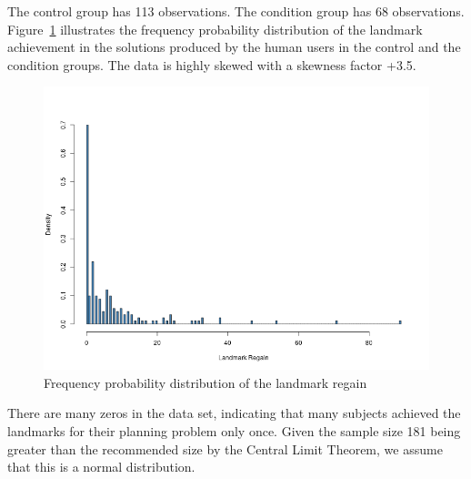 The control group has 113 observations.
The condition group has 68 observations.
Figure~\ref{fig:histreg} illustrates the frequency probability distribution of the landmark achievement in the solutions produced by the human users in the control and the condition groups. 
The data is highly skewed with a skewness factor +3.5.
\begin{figure}[tpb]
  \centering
\includegraphics[width=0.7\columnwidth]{img/histo_regain.png}
  \caption{Frequency probability distribution of the landmark regain}
  \label{fig:histreg}
\end{figure}

There are many zeros in the data set, indicating that many subjects achieved the landmarks for their planning problem only once.
Given the sample size 181 being greater than the recommended size by the Central Limit Theorem, we assume that this is a normal distribution.
%


